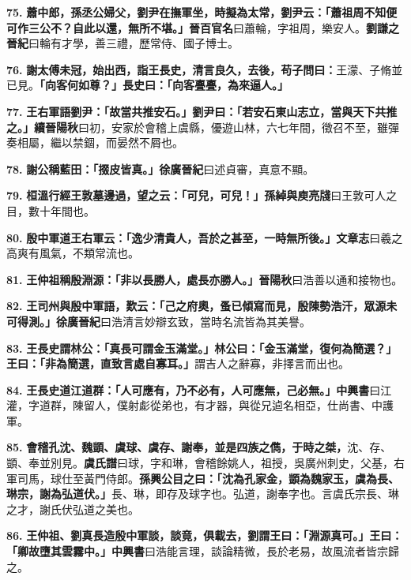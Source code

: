 \textbf{75.} \textbf{蕭中郎，孫丞公婦父，劉尹在撫軍坐，時擬為太常，劉尹云：「蕭祖周不知便可作三公不？自此以還，無所不堪。」}{\footnotesize \textbf{晉百官名}曰蕭輪，字祖周，樂安人。\textbf{劉謙之晉紀}曰輪有才學，善三禮，歷常侍、國子博士。}

\textbf{76.} \textbf{謝太傅未冠，始出西，詣王長史，清言良久，去後，苟子問曰：}{\footnotesize 王濛、子脩並已見。}\textbf{「向客何如尊？」長史曰：「向客亹亹，為來逼人。」}

\textbf{77.} \textbf{王右軍語劉尹：「故當共推安石。」劉尹曰：「若安石東山志立，當與天下共推之。」}{\footnotesize \textbf{續晉陽秋}曰初，安家於會稽上虞縣，優遊山林，六七年間，徵召不至，雖彈奏相屬，繼以禁錮，而晏然不屑也。}

\textbf{78.} \textbf{謝公稱藍田：「掇皮皆真。」}{\footnotesize \textbf{徐廣晉紀}曰述貞審，真意不顯。}

\textbf{79.} \textbf{桓溫行經王敦墓邊過，望之云：「可兒，可兒！」}{\footnotesize \textbf{孫綽與庾亮牋}曰王敦可人之目，數十年間也。}

\textbf{80.} \textbf{殷中軍道王右軍云：「逸少清貴人，吾於之甚至，一時無所後。」}{\footnotesize \textbf{文章志}曰羲之高爽有風氣，不類常流也。}

\textbf{81.} \textbf{王仲祖稱殷淵源：「非以長勝人，處長亦勝人。」}{\footnotesize \textbf{晉陽秋}曰浩善以通和接物也。}

\textbf{82.} \textbf{王司州與殷中軍語，歎云：「己之府奧，蚤已傾寫而見，殷陳勢浩汗，眾源未可得測。」}{\footnotesize \textbf{徐廣晉紀}曰浩清言妙辯玄致，當時名流皆為其美譽。}

\textbf{83.} \textbf{王長史謂林公：「真長可謂金玉滿堂。」林公曰：「金玉滿堂，復何為簡選？」王曰：「非為簡選，直致言處自寡耳。」}{\footnotesize 謂吉人之辭寡，非擇言而出也。}

\textbf{84.} \textbf{王長史道江道群：「人可應有，乃不必有，人可應無，己必無。」}{\footnotesize \textbf{中興書}曰江灌，字道群，陳留人，僕射虨從弟也，有才器，與從兄逌名相亞，仕尚書、中護軍。}

\textbf{85.} \textbf{會稽孔沈、魏顗、虞球、虞存、謝奉，並是四族之儁，于時之桀，}{\footnotesize 沈、存、顗、奉並別見。\textbf{虞氏譜}曰球，字和琳，會稽餘姚人，祖授，吳廣州刺史，父基，右軍司馬，球仕至黃門侍郎。}\textbf{孫興公目之曰：「沈為孔家金，顗為魏家玉，虞為長、琳宗，謝為弘道伏。」}{\footnotesize 長、琳，即存及球字也。弘道，謝奉字也。言虞氏宗長、琳之才，謝氏伏弘道之美也。}

\textbf{86.} \textbf{王仲祖、劉真長造殷中軍談，談竟，俱載去，劉謂王曰：「淵源真可。」王曰：「卿故墮其雲霧中。」}{\footnotesize \textbf{中興書}曰浩能言理，談論精微，長於老易，故風流者皆宗歸之。}

